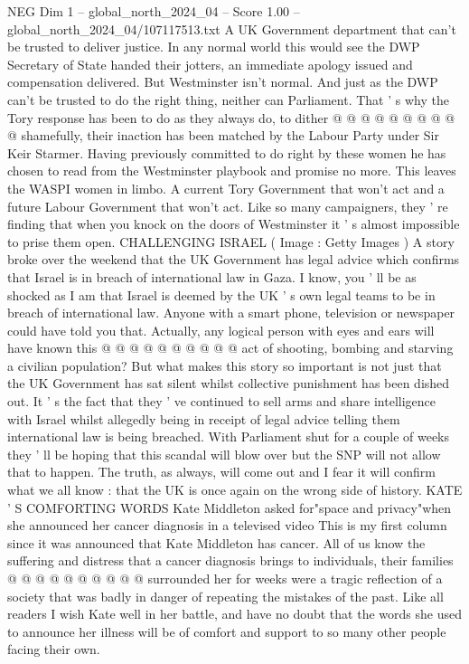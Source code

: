 \begin{textsample}{NEG Dim 1 – global\_north\_2024\_04 – Score 1.00 – global\_north\_2024\_04/107117513.txt}
A UK Government department that can't be trusted to deliver justice.
In any normal world this would see the DWP Secretary of State handed their jotters, an immediate apology issued and compensation delivered.
But Westminster isn't normal.
And just as the DWP can't be trusted to do the right thing, neither can Parliament.
That ' s why the Tory response has been to do as they always do, to dither @ @ @ @ @ @ @ @ @ @ shamefully, their inaction has been matched by the Labour Party under Sir Keir Starmer.
Having previously committed to do right by these women he has chosen to read from the Westminster playbook and promise no more.
This leaves the WASPI women in limbo.
A current Tory Government that won't act and a future Labour Government that won't act.
Like so many campaigners, they ' re finding that when you knock on the doors of Westminster it ' s almost impossible to prise them open.
CHALLENGING ISRAEL ( Image : Getty Images ) A story broke over the weekend that the UK Government has legal advice which confirms that Israel is in breach of international law in Gaza.
I know, you ' ll be as shocked as I am that Israel is deemed by the UK ' s own legal teams to be in breach of international law.
Anyone with a smart phone, television or newspaper could have told you that.
Actually, any logical person with eyes and ears will have known this @ @ @ @ @ @ @ @ @ @ act of shooting, bombing and starving a civilian population?
But what makes this story so important is not just that the UK Government has sat silent whilst collective punishment has been dished out.
It ' s the fact that they ' ve continued to sell arms and share intelligence with Israel whilst allegedly being in receipt of legal advice telling them international law is being breached.
With Parliament shut for a couple of weeks they ' ll be hoping that this scandal will blow over but the SNP will not allow that to happen.
The truth, as always, will come out and I fear it will confirm what we all know : that the UK is once again on the wrong side of history.
KATE ' S COMFORTING WORDS Kate Middleton asked for"space and privacy"when she announced her cancer diagnosis in a televised video This is my first column since it was announced that Kate Middleton has cancer.
All of us know the suffering and distress that a cancer diagnosis brings to individuals, their families @ @ @ @ @ @ @ @ @ @ surrounded her for weeks were a tragic reflection of a society that was badly in danger of repeating the mistakes of the past.
Like all readers I wish Kate well in her battle, and have no doubt that the words she used to announce her illness will be of comfort and support to so many other people facing their own.

\end{textsample}
